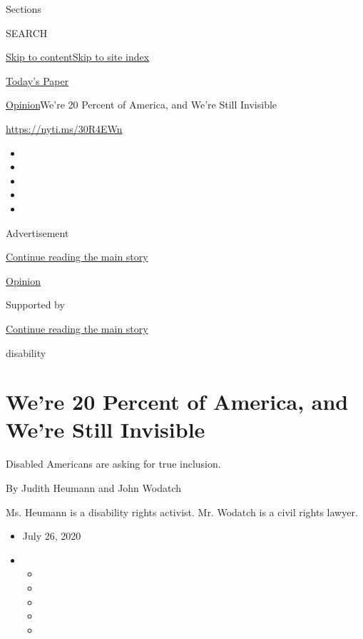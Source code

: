 Sections

SEARCH

\protect\hyperlink{site-content}{Skip to
content}\protect\hyperlink{site-index}{Skip to site index}

\href{https://myaccount.nytimes.com/auth/login?response_type=cookie\&client_id=vi}{}

\href{https://www.nytimes.com/section/todayspaper}{Today's Paper}

\href{/section/opinion}{Opinion}\textbar{}We're 20 Percent of America,
and We're Still Invisible

\href{https://nyti.ms/30R4EWn}{https://nyti.ms/30R4EWn}

\begin{itemize}
\item
\item
\item
\item
\item
\end{itemize}

Advertisement

\protect\hyperlink{after-top}{Continue reading the main story}

\href{/section/opinion}{Opinion}

Supported by

\protect\hyperlink{after-sponsor}{Continue reading the main story}

disability

\hypertarget{were-20-percent-of-america-and-were-still-invisible}{%
\section{We're 20 Percent of America, and We're Still
Invisible}\label{were-20-percent-of-america-and-were-still-invisible}}

Disabled Americans are asking for true inclusion.

By Judith Heumann and John Wodatch

Ms. Heumann is a disability rights activist. Mr. Wodatch is a civil
rights lawyer.

\begin{itemize}
\item
  July 26, 2020
\item
  \begin{itemize}
  \item
  \item
  \item
  \item
  \item
  \end{itemize}
\end{itemize}

